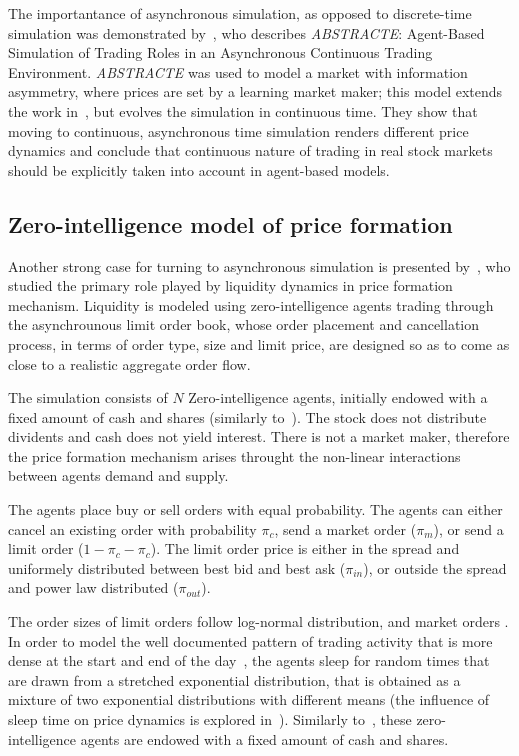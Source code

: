 The importantance of asynchronous simulation, as opposed to discrete-time simulation was demonstrated by~\citet{Sorban2008}, who describes \textit{ABSTRACTE}: Agent-Based Simulation of Trading Roles in an Asynchronous Continuous Trading Environment. \textit{ABSTRACTE} was used to model a market with information asymmetry, where prices are set by a learning market maker; this model extends the work in~\citep{Das2006}, but evolves the simulation in continuous time. They show that moving to continuous, asynchronous time simulation renders different price dynamics and conclude that continuous nature of trading in real stock markets should be explicitly taken into account in agent-based models.

\subsection{Zero-intelligence model of price formation}

Another strong case for turning to asynchronous simulation is presented by~\citet[chap.~4]{Gilles2006}, who studied the primary role played by liquidity dynamics in price formation mechanism. Liquidity is modeled using zero-intelligence agents trading through the asynchrounous limit order book, whose order placement and cancellation process, in terms of order type, size and limit price, are designed so as to come as close to a realistic aggregate order flow. 

The simulation consists of $N$ Zero-intelligence agents, initially endowed with a fixed amount of cash and shares (similarly to~\cite{Raberto2001}). The stock does not distribute dividents and cash does not yield interest. There is not a market maker, therefore the price formation mechanism arises throught the non-linear interactions between agents demand and supply.

The agents place buy or sell orders with equal probability. The agents can either cancel an existing order with probability $\pi_c$, send a market order ($\pi_m$), or send a limit order ($1-\pi_c-\pi_c$). The limit order price is either in the spread and uniformely distributed between best bid and best ask ($\pi_{in}$), or outside the spread and power law distributed ($\pi_{out}$).

The order sizes of limit orders follow log-normal distribution, and market orders . In order to model the well documented pattern of trading activity that is more dense at the start and end of the day~\cite{Clark1973}, the agents sleep for random times that are drawn from a stretched exponential distribution, that is obtained as a mixture of two exponential distributions with different means (the influence of sleep time on price dynamics is explored in~\cite{Scalas2004}). Similarly to~\cite{Raberto2001}, these zero-intelligence agents are endowed with a fixed amount of cash and shares.








   







